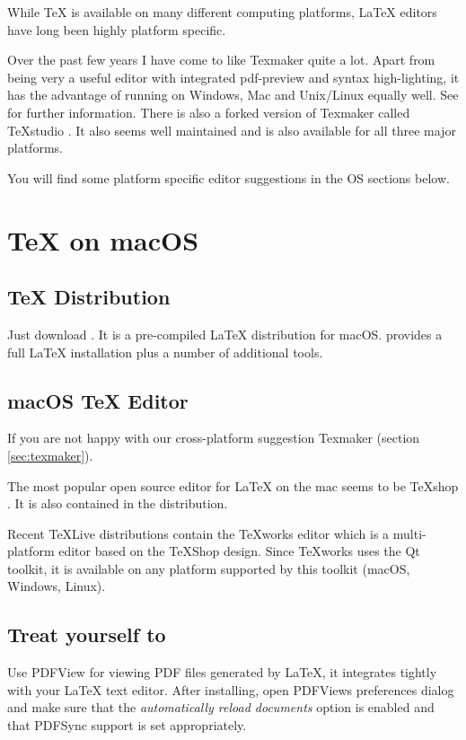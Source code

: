 While \TeX{} is available on many different computing platforms, \LaTeX{}
editors have long been highly platform specific.

Over the past few years I have come to like Texmaker quite a lot.
Apart from being very a useful editor with integrated pdf-preview and syntax
high-lighting, it has the advantage of running on Windows, Mac and
Unix/Linux equally well.  See \cite{texmaker} for
further information.  There is also a forked version of Texmaker called
TeXstudio \cite{texstudio}.  It also seems well
maintained and is also available for all three major platforms.

You will find some platform specific editor suggestions in the OS sections
below.

\section{\TeX{} on macOS}

\subsection{\TeX{} Distribution}

Just download  \cite{mactex}. It is a
pre-compiled \LaTeX{} distribution for macOS.  provides a full \LaTeX{}
installation plus a number of additional tools.

\subsection{macOS \TeX{} Editor}

If you are not happy with our cross-platform suggestion Texmaker (section \ref{sec:texmaker}).

The most popular open source editor for \LaTeX{} on the mac seems to be
\TeX{}shop \cite{texshop}. It
is also contained in the  distribution.

Recent \TeX Live distributions contain the \TeX{}works editor \cite{texworks}
which is a multi-platform editor based on the \TeX{}Shop
design. Since \TeX{}works uses the Qt toolkit, it is available on any platform
supported by this toolkit (macOS, Windows, Linux).

\subsection{Treat yourself to }

Use PDFView \cite{pdfview} for viewing PDF files generated by \LaTeX{}, it integrates tightly
with your \LaTeX{} text editor. After installing, open
PDFViews preferences dialog and make sure that the \emph{automatically reload
documents} option is enabled and that PDFSync support is set appropriately.

